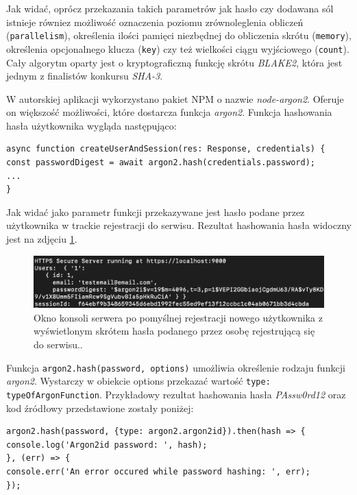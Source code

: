 Jak widać, oprócz przekazania takich parametrów jak hasło czy dodawana sól istnieje równiez możliwość oznaczenia poziomu zrównoleglenia obliczeń (\texttt{parallelism}), określenia ilości pamięci niezbędnej do obliczenia skrótu (\texttt{memory}), określenia opcjonalnego klucza (\texttt{key}) czy też wielkości ciągu wyjściowego (\texttt{count}). Cały algorytm oparty jest o kryptograficzną funkcję skrótu \textit{BLAKE2}, która jest jednym z finalistów konkursu \textit{SHA-3}. 

W autorskiej aplikacji wykorzystano pakiet NPM o nazwie \textit{node-argon2}. Oferuje on większość możliwości, które dostarcza funkcja \textit{argon2}. Funkcja hashowania hasła użytkownika wygląda następująco:

\begin{verbatim}
async function createUserAndSession(res: Response, credentials) {
const passwordDigest = await argon2.hash(credentials.password);
...
}
\end{verbatim}

Jak widać jako parametr funkcji przekazywane jest hasło podane przez użytkownika w trackie rejestracji do serwisu. Rezultat hashowania hasła widoczny jest na zdjęciu \ref{Rys:argon2}.

\begin{figure}[h]
	\centering\includegraphics[scale=0.75]{images/security/argon2.png}
	\caption{Okno konsoli serwera po pomyślnej rejestracji nowego użytkownika z wyświetlonym skrótem hasła podanego przez osobę rejestrującą się do serwisu..}
	\label{Rys:argon2}
\end{figure}

Funkcja \texttt{argon2.hash(password, {options})} umożliwia określenie rodzaju funkcji \textit{argon2}. Wystarczy w obiekcie options przekazać wartość \texttt{type: typeOfArgonFunction}. Przykładowy rezultat hashowania hasła \textit{PAssw0rd12} oraz kod źródłowy przedstawione zostały poniżej:

\begin{verbatim}
argon2.hash(password, {type: argon2.argon2id}).then(hash => {
console.log('Argon2id password: ', hash);
}, (err) => {
console.err('An error occured while password hashing: ', err);
});
\end{verbatim}

